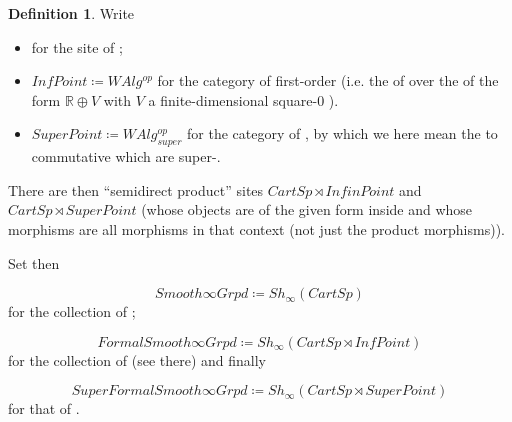 \documentclass[12pt,titlepage]{article}
\theoremstyle{plain}
\theoremstyle{definition}
\newtheorem{defn}{Definition}
\theoremstyle{remark}
\begin{document}
\begin{defn}
\label{SupergeometricModel}\hypertarget{SupergeometricModel}{}
Write

\begin{itemize}%
\item {} for the site of ;


\item $InfPoint \coloneqq WAlg^{op}$ for the category of first-order  (i.e. the  of  over the  of the form $\mathbb{R}\oplus V$ with $V$ a finite-dimensional square-0 ).


\item $SuperPoint \coloneqq WAlg_{super}^{op}$ for the category of , by which we here mean the  to commutative  which are super-.



\end{itemize}
There are then ``semidirect product'' sites $CartSp \rtimes InfinPoint$ and $CartSp \rtimes SuperPoint$ (whose objects are  of the given form inside  and whose morphisms are all morphisms in that context (not just the product morphisms)).

Set then

\begin{displaymath}
Smooth \infty Grpd \coloneqq Sh_\infty(CartSp)
\end{displaymath}
for the collection of ;

\begin{displaymath}
FormalSmooth\infty Grpd \coloneqq Sh_\infty(CartSp \rtimes InfPoint)
\end{displaymath}
for the collection of  (see there) and finally

\begin{displaymath}
SuperFormalSmooth\infty Grpd \coloneqq Sh_\infty(CartSp \rtimes SuperPoint)
\end{displaymath}
for that of .

\end{defn}
\end{document}
